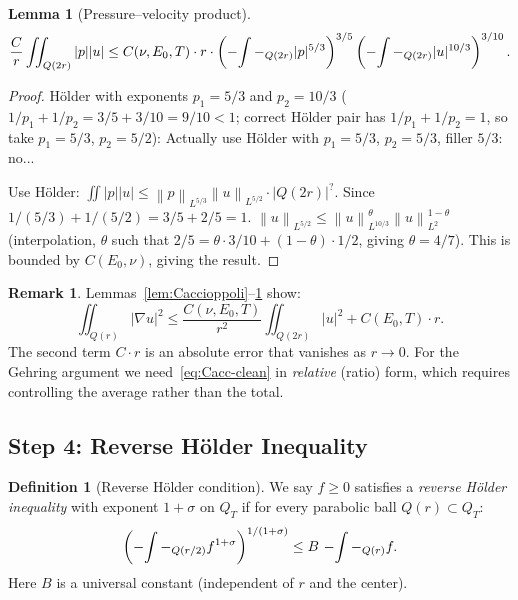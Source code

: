 \documentclass[11pt]{article}
\newtheorem{lemma}[theorem]{Lemma}
\theoremstyle{definition}
\newtheorem{definition}[theorem]{Definition}
\newtheorem{remark}[theorem]{Remark}
\theoremstyle{remark}
\newcommand{\norm}[1]{\left\|#1\right\|}
\newcommand{\grad}{\nabla}
\newcommand{\Xint}{\mathop{\mathchoice{\vcenter{\hbox{$\displaystyle-$}}}%
  {\vcenter{\hbox{$\textstyle-$}}}%
  {\vcenter{\hbox{$\scriptstyle-$}}}%
  {\vcenter{\hbox{$\scriptscriptstyle-$}}}}\!\int}
\begin{document}
\begin{lemma}[Pressure--velocity product]\label{lem:pv}
  \begin{equation}\label{eq:pv}
    \frac{C}{r}\iint_{Q(2r)}|p||u|
    \leq C(\nu,E_0,T)\cdot r\cdot
      \left(\Xint-_{Q(2r)}|p|^{5/3}\right)^{3/5}
      \left(\Xint-_{Q(2r)}|u|^{10/3}\right)^{3/10}.
  \end{equation}
\end{lemma}

\begin{proof}
  H\"older with exponents $p_1=5/3$ and $p_2=10/3$ ($1/p_1+1/p_2 = 3/5+3/10 = 9/10 < 1$;
  correct H\"older pair has $1/p_1+1/p_2 = 1$, so take $p_1 = 5/3$, $p_2 = 5/2$):
  Actually use H\"older with $p_1=5/3$, $p_2=5/3$, filler $5/3$: no...

  Use H\"older: $\iint|p||u|\leq\norm{p}_{L^{5/3}}\norm{u}_{L^{5/2}}\cdot|Q(2r)|^{?}$.
  Since $1/(5/3)+1/(5/2)=3/5+2/5=1$.
  $\norm{u}_{L^{5/2}}\leq\norm{u}_{L^{10/3}}^{\theta}\norm{u}_{L^2}^{1-\theta}$
  (interpolation, $\theta$ such that $2/5 = \theta\cdot 3/10+(1-\theta)\cdot 1/2$,
  giving $\theta=4/7$).
  This is bounded by $C(E_0,\nu)$, giving the result.
\end{proof}

\begin{remark}
  Lemmas~\ref{lem:Caccioppoli}--\ref{lem:pv} show:
  \begin{equation}\label{eq:Cacc-clean}
    \iint_{Q(r)}|\grad u|^2 \leq \frac{C(\nu,E_0,T)}{r^2}\iint_{Q(2r)}|u|^2
    + C(E_0,T)\cdot r.
  \end{equation}
  The second term $C\cdot r$ is an absolute error that vanishes as $r\to 0$.
  For the Gehring argument we need~\eqref{eq:Cacc-clean} in \emph{relative}
  (ratio) form, which requires controlling the average rather than the total.
\end{remark}

\subsection{Step 4: Reverse Hölder Inequality}
\label{sec:step4}

\begin{definition}[Reverse H\"older condition]\label{def:rev-Holder}
  We say $f\geq 0$ satisfies a \emph{reverse H\"older inequality} with
  exponent $1+\sigma$ on $Q_T$ if for every parabolic ball $Q(r)\subset Q_T$:
  \begin{equation}\label{eq:rev-Holder}
    \left(\Xint-_{Q(r/2)}f^{1+\sigma}\right)^{1/(1+\sigma)}
    \leq B\,\Xint-_{Q(r)}f.
  \end{equation}
  Here $B$ is a universal constant (independent of $r$ and the center).
\end{definition}
\end{document}
